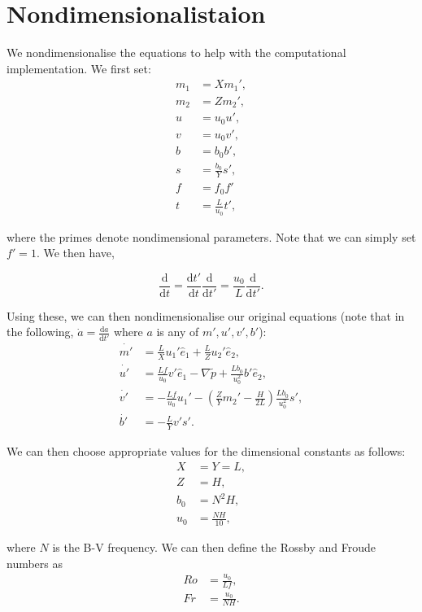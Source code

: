 \documentclass[11pt, oneside]{article}   	%
\newcommand{\eone}{\hat{e}_1}
\newcommand{\etwo}{\hat{e}_2}
\begin{document}
\section{Nondimensionalistaion}

We nondimensionalise the equations to help with the computational implementation. We first set:
\begin{align} 
m_1 &= X m_1', \\
m_2 &= Z m_2', \\
u &= u_0 u', \\
v &=  u_0 v', \\
b &= b_0 b', \\
s &= \frac{b_0}{Y} s', \\
f &= f_0 f' \\
t &= \frac{L}{u_0} t',
\end{align}

where the primes denote nondimensional parameters. Note that we can simply set \(f' = 1\). We then have, 

\begin{equation}
\frac{\mathrm d}{\mathrm d t} = \frac{\mathrm d t'}{\mathrm d t} \frac{\mathrm d}{\mathrm d t'} = \frac{u_0}{L} \frac{\mathrm d}{\mathrm d t'}.
\end{equation}

Using these, we can then nondimensionalise our original equations (note that in the following, \(\dot{a} = \frac{\mathrm d a}{\mathrm d t'}\) where \(a\) is any of \(m', u', v', b'\)):
\begin{align} 
\dot{m'} &= \frac{L}{X} u_1' \eone +  \frac{L}{Z} u_2' \etwo, \\
\dot{u'} &= \frac{L f}{u_0} v' \eone - \nabla \tilde{p} + \frac{L b_0}{u_0^2} b' \etwo, \\
\dot{v'} &= -\frac{L f}{u_0} u_1' - (\frac{Z}{Y} m_2' - \frac{H}{2L}) \frac{L b_0}{u_0^2} s', \\
\dot{b'} &= -\frac{L}{Y} v' s'.
\end{align}

We can then choose appropriate values for the dimensional constants as follows:
\begin{align} 
X &= Y = L, \\
Z &= H, \\
b_0 &= N^2 H, \\
u_0 &= \frac{N H}{10},
\end{align}

where \(N\) is the B-V frequency. We can then define the Rossby and Froude numbers as
\begin{align} 
Ro &= \frac{u_0}{L f}, \\
Fr &= \frac{u_0}{N H}.
\end{align}
\end{document}
